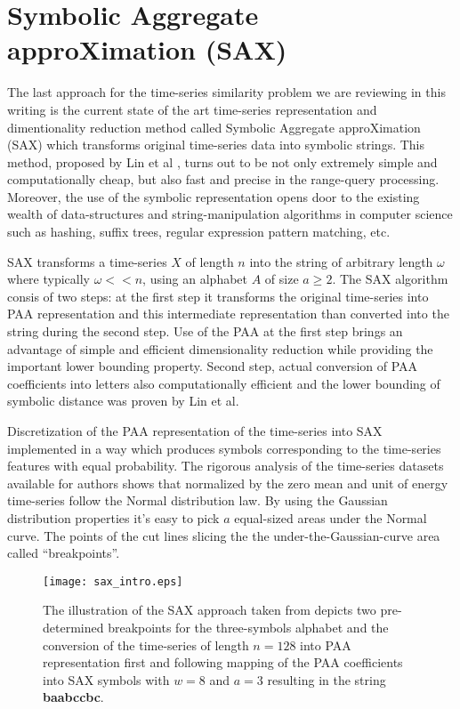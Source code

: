 \section{Symbolic Aggregate approXimation (SAX)}
The last approach for the time-series similarity problem we are reviewing in this writing is the current state of the art time-series representation and dimentionality reduction method called Symbolic Aggregate approXimation (SAX) which transforms original time-series data into symbolic strings. This method, proposed by Lin et al \cite{citeulike:2821475}, turns out to be not only extremely simple and computationally cheap, but also fast and precise in the range-query processing. Moreover, the use of the symbolic representation opens door to the existing wealth of data-structures and string-manipulation algorithms in computer science such as hashing, suffix trees, regular expression pattern matching, etc.

SAX transforms a time-series $X$ of length $n$ into the string of arbitrary length $\omega$ where typically $\omega << n$, using an alphabet $A$ of size $ a \geq 2$. The SAX algorithm consis of two steps: at the first step it transforms the original time-series into PAA representation and this intermediate representation than converted into the string during the second step. Use of the PAA at the first step brings an advantage of simple and efficient dimensionality reduction while providing the important lower bounding property. Second step, actual conversion of PAA coefficients into letters also computationally efficient and the lower bounding of symbolic distance was proven by Lin et al.

Discretization of the PAA representation of the time-series into SAX implemented in a way which produces symbols corresponding to the time-series features with equal probability. The rigorous analysis of the time-series datasets available for authors shows that normalized by the zero mean and unit of energy time-series follow the Normal distribution law. By using the Gaussian distribution properties \cite{citeulike:167581} it's easy to pick $a$ equal-sized areas under the Normal curve. The points of the cut lines slicing the the under-the-Gaussian-curve area called ``breakpoints''.
\begin{figure}[tbp]
   \centering
   \texttt{[image: sax\_intro.eps]}
   \caption{The illustration of the SAX approach taken from \cite{citeulike:2821475} depicts two pre-determined breakpoints for the three-symbols alphabet and the conversion of the time-series of length $n=128$ into PAA representation first and following mapping of the PAA coefficients into SAX symbols with $w=8$ and $a=3$ resulting in the string \textbf{baabccbc}.}
   \label{fig:sax_intro}
\end{figure}

